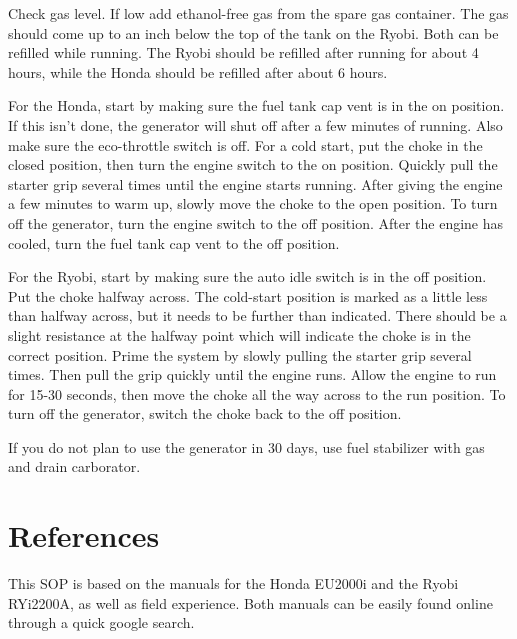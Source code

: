\documentclass[12pt]{../SOP3_alpha}
\begin{document}
\NP Check gas level. If low add ethanol-free gas from the spare gas container. The gas should come up to an inch below the top of the tank on the Ryobi. Both can be refilled while running. The Ryobi should be refilled after running for about 4 hours, while the Honda should be refilled after about 6 hours. 

\NP For the Honda, start by making sure the fuel tank cap vent is in the on position. If this isn't done, the generator will shut off after a few minutes of running. Also make sure the eco-throttle switch is off. For a cold start, put the choke in the closed position, then turn the engine switch to the on position. 
  Quickly pull the starter grip several times until the engine starts running. After giving the engine a few minutes to warm up, slowly move the choke to the open position.
  To turn off the generator, turn the engine switch to the off position. After the engine has cooled, turn the fuel tank cap vent to the off position. 

\NP For the Ryobi, start by making sure the auto idle switch is in the off position. Put the choke halfway across. The cold-start position is marked as a little less than halfway across, but it needs to be further than indicated. There should be a slight resistance at the halfway point which will indicate the choke is in the correct position.
  Prime the system by slowly pulling the starter grip several times. Then pull the grip quickly until the engine runs. Allow the engine to run for 15-30 seconds, then move the choke all the way across to the run position.
  To turn off the generator, switch the choke back to the off position.

\NP If you do not plan to use the generator in 30 days, use fuel stabilizer with gas and drain carborator. 

\section{References}

\NP This SOP is based on the manuals for the Honda EU2000i and the Ryobi RYi2200A, as well as field experience. Both manuals can be easily found online through a quick google search.  
\end{document}
